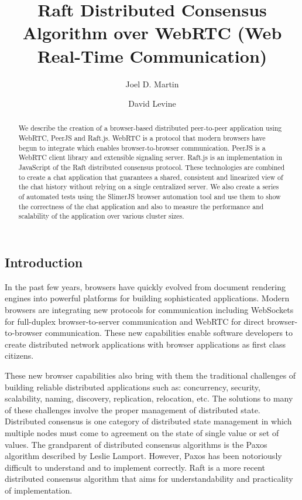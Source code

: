 \documentclass[9pt]{extarticle}
\title{Raft Distributed Consensus Algorithm over WebRTC (Web Real-Time Communication)}
\author{Joel D. Martin}
\author{David Levine}
\affil{University of Texas at Arlington}
\begin{document}
\maketitle

\begin{multicols}{2}

\begin{abstract}
We describe the creation of a browser-based distributed peer-to-peer
application using WebRTC, PeerJS and Raft.js. WebRTC is a protocol that modern
browsers have begun to integrate which enables browser-to-browser
communication. PeerJS is a WebRTC client library and extensible signaling
server. Raft.js is an implementation in JavaScript of the Raft distributed
consensus protocol. These technologies are combined to create a chat
application that guarantees a shared, consistent and linearized view of the
chat history without relying on a single centralized server. We also create a
series of automated tests using the SlimerJS browser automation tool and use
them to show the correctness of the chat application and also to measure the
performance and scalability of the application over various cluster sizes.
\end{abstract}

\section{Introduction}
In the past few years, browsers have quickly evolved from document
rendering engines into powerful platforms for building sophisticated
applications. Modern browsers are integrating new protocols for
communication including WebSockets for full-duplex browser-to-server
communication and WebRTC for direct browser-to-browser communication.
These new capabilities enable software developers to create
distributed network applications with browser applications as first
class citizens.

These new browser capabilities also bring with them the traditional
challenges of building reliable distributed applications such as:
concurrency, security, scalability, naming, discovery, replication,
relocation, etc. The solutions to many of these challenges involve
the proper management of distributed state. Distributed consensus is
one category of distributed state management in which multiple nodes
must come to agreement on the state of single value or set of values.
The grandparent of distributed consensus algorithms is the Paxos
algorithm described by Leslie Lamport. However, Paxos has been
notoriously difficult to understand and to implement correctly. Raft
is a more recent distributed consensus algorithm that aims for
understandability and practicality of implementation.


\end{multicols}
\end{document}
